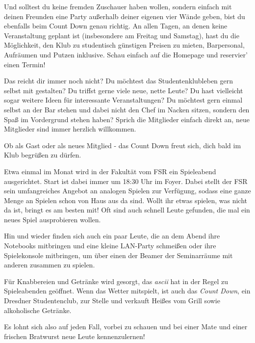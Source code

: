 Und solltest du keine fremden Zuschauer haben wollen, sondern einfach mit deinen Freunden eine Party außerhalb deiner eigenen vier Wände geben, bist du ebenfalls beim Count Down genau richtig.
An allen Tagen, an denen keine Veranstaltung geplant ist (insbesondere am Freitag und Samstag), hast du die Möglichkeit, den Klub zu studentisch günstigen Preisen zu mieten, Barpersonal, Aufräumen und Putzen inklusive.
Schau einfach auf die Homepage und reservier' einen Termin!

Das reicht dir immer noch nicht?
Du möchtest das Studentenklubleben gern selbst mit gestalten?
Du triffst gerne viele neue, nette Leute?
Du hast vielleicht sogar weitere Ideen für interessante Veranstaltungen?
Du möchtest gern einmal selbst an der Bar stehen und dabei nicht den Chef im Nacken sitzen, sondern den Spaß im Vordergrund stehen haben?
Sprich die Mitglieder einfach direkt an, neue Mitglieder sind immer herzlich willkommen.

Ob als Gast oder als neues Mitglied - das Count Down freut sich, dich bald im Klub begrüßen zu dürfen.


Etwa einmal im Monat wird in der Fakultät vom FSR ein Spieleabend ausgerichtet. Start ist dabei immer um 18:30 Uhr im Foyer. Dabei stellt der FSR sein umfangreiches Angebot an analogen Spielen zur Verfügung, sodass eine ganze Menge an Spielen schon von Haus aus da sind. Wollt ihr etwas spielen, was nicht da ist, bringt es am besten mit! Oft sind auch schnell Leute gefunden, die mal ein neues Spiel ausprobieren wollen.

Hin und wieder finden sich auch ein paar Leute, die an dem Abend ihre Notebooks mitbringen und eine kleine LAN-Party schmeißen oder ihre Spielekonsole mitbringen, um über einen der Beamer der Seminarräume mit anderen zusammen zu spielen.

Für Knabbereien und Getränke wird gesorgt, das \emph{ascii} hat in der Regel zu Spieleabenden geöffnet. Wenn das Wetter mitspielt, ist auch das \emph{Count Down}, ein Dresdner Studentenclub, zur Stelle und verkauft Heißes vom Grill sowie alkoholische Getränke.

Es lohnt sich also auf jeden Fall, vorbei zu schauen und bei einer Mate und einer frischen Bratwurst neue Leute kennenzulernen!

\pagebreak

\
\thispagestyle{empty}
